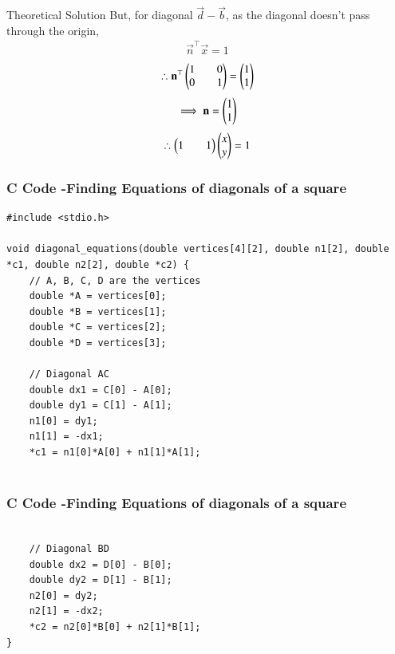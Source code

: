 \documentclass{beamer}
\begin{document}
\begin{frame}{Theoretical Solution}
But, for diagonal $\vec{d}-\vec{b}$, as the diagonal doesn't pass through the origin,
\begin{align}
    \vec{n}^{\top}\vec{x}=1
\end{align}
\begin{align}
    \therefore \mathbf{n}^{\top}\begin{pmatrix}1&&0\\0&&1\end{pmatrix}=\begin{pmatrix}1\\1\end{pmatrix}
\end{align}
\begin{align}
    \implies \mathbf{n}=\begin{pmatrix}1\\1\end{pmatrix}
\end{align}
\begin{align}
    \therefore \begin{pmatrix}1&&1\end{pmatrix}\begin{pmatrix}x\\y\end{pmatrix}=1
\end{align}
\end{frame}

\begin{frame}[fragile]
    \frametitle{C Code -Finding Equations of diagonals of a square}

    \begin{lstlisting}
#include <stdio.h>

void diagonal_equations(double vertices[4][2], double n1[2], double *c1, double n2[2], double *c2) {
    // A, B, C, D are the vertices
    double *A = vertices[0];
    double *B = vertices[1];
    double *C = vertices[2];
    double *D = vertices[3];

    // Diagonal AC
    double dx1 = C[0] - A[0];
    double dy1 = C[1] - A[1];
    n1[0] = dy1;
    n1[1] = -dx1;
    *c1 = n1[0]*A[0] + n1[1]*A[1];


    \end{lstlisting}
\end{frame}

\begin{frame}[fragile]
    \frametitle{C Code -Finding Equations of diagonals of a square}

    \begin{lstlisting}

    // Diagonal BD
    double dx2 = D[0] - B[0];
    double dy2 = D[1] - B[1];
    n2[0] = dy2;
    n2[1] = -dx2;
    *c2 = n2[0]*B[0] + n2[1]*B[1];
}
    \end{lstlisting}
\end{frame}
\end{document}
